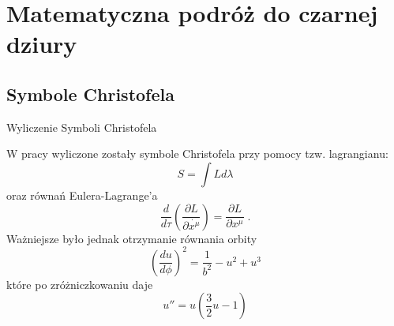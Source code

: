 \documentclass[polish, 9pt, xcolor=table, hyperref={pdfpagemode=FullScreen}]{beamer}
\begin{document}
\section{Matematyczna podróż do czarnej dziury}

\subsection{Symbole Christofela}

\begin{frame}{Wyliczenie Symboli Christofela}

  W pracy wyliczone zostały symbole Christofela przy pomocy tzw. lagrangianu:
$$ S = \int L d \lambda $$
%
%
%
oraz równań Eulera-Lagrange'a
$$\frac{d}{ d \tau}\left(\frac{\partial L}{\partial \dot{x^\mu}}\right)= \frac{\partial L}{\partial x^\mu}\; . $$
Ważniejsze było jednak otrzymanie równania orbity
$$\left(\frac{du}{d\phi}\right)^2=\frac{1}{b^2}-u^2+u^3$$
które po zróżniczkowaniu daje
$$u'' =u\left(\frac{3}{2}u-1\right)$$
\end{frame}
\end{document}
